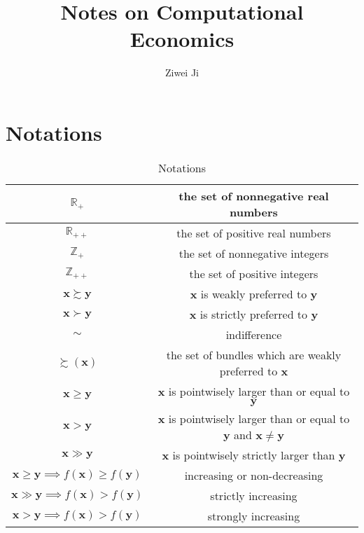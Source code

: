 \documentclass[openany]{book}
\author{Ziwei Ji}
\title{Notes on Computational Economics}
\theoremstyle{remark}
\begin{document}
\maketitle
\tableofcontents

\chapter*{Notations}
\begin{table}[h]
\begin{center}
\begin{tabular}{|c|c|}
\hline
$\mathbb{R}_+$ & the set of nonnegative real numbers \\
\hline
$\mathbb{R}_{++}$ & the set of positive real numbers \\
\hline
$\mathbb{Z}_+$ & the set of nonnegative integers \\
\hline
$\mathbb{Z}_{++}$ & the set of positive integers \\
\hline
$\boldsymbol{x}\succsim \boldsymbol{y}$ & $\boldsymbol{x}$ is weakly preferred to $\boldsymbol{y}$ \\
\hline
$\boldsymbol{x}\succ \boldsymbol{y}$ & $\boldsymbol{x}$ is strictly preferred to $\boldsymbol{y}$ \\
\hline
$\sim$ & indifference \\
\hline
$\succsim\!(\boldsymbol{x})$ & the set of bundles which are weakly preferred to $\boldsymbol{x}$ \\
\hline
$\boldsymbol{x}\ge \boldsymbol{y}$ & $\boldsymbol{x}$ is pointwisely larger than or equal to $\boldsymbol{y}$ \\
\hline
$\boldsymbol{x}>\boldsymbol{y}$ & $\boldsymbol{x}$ is pointwisely larger than or equal to $\boldsymbol{y}$ and $\boldsymbol{x}\ne \boldsymbol{y}$ \\
\hline
$\boldsymbol{x}\gg \boldsymbol{y}$ & $\boldsymbol{x}$ is pointwisely strictly larger than $\boldsymbol{y}$ \\
\hline
$\boldsymbol{x}\ge \boldsymbol{y}\implies f(\boldsymbol{x})\ge f(\boldsymbol{y})$ & increasing or non-decreasing \\
\hline
$\boldsymbol{x}\gg \boldsymbol{y}\implies f(\boldsymbol{x})>f(\boldsymbol{y})$ & strictly increasing \\
\hline
$\boldsymbol{x}>\boldsymbol{y}\implies f(\boldsymbol{x})>f(\boldsymbol{y})$ & strongly increasing \\
\hline
\end{tabular}
\end{center}
\caption{Notations}
\end{table}
\end{document}
